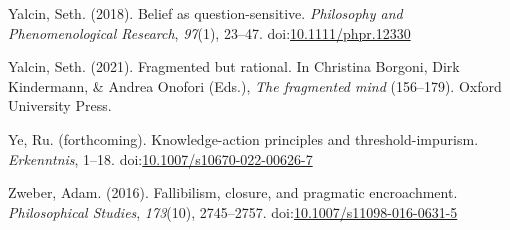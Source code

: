 \documentclass[
  12pt,
  letterpaper,
]{scrbook}
\newlength{\cslhangindent}
\newenvironment{CSLReferences}[2] %
 {\begin{list}{}{%
  \setlength{\itemindent}{0pt}
  \setlength{\leftmargin}{0pt}
  \setlength{\parsep}{0pt}
  \ifodd #1
   \setlength{\leftmargin}{\cslhangindent}
   \setlength{\itemindent}{-1\cslhangindent}
  \fi
  \setlength{\itemsep}{#2\baselineskip}}}
 {\end{list}}
\begin{document}
\begin{CSLReferences}{1}{0}
Yalcin, Seth. (2018). Belief as question-sensitive. \emph{Philosophy and
Phenomenological Research}, \emph{97}(1), 23--47.
doi:\href{https://doi.org/10.1111/phpr.12330}{10.1111/phpr.12330}

Yalcin, Seth. (2021). Fragmented but rational. In Christina Borgoni,
Dirk Kindermann, \& Andrea Onofori (Eds.), \emph{The fragmented mind}
(156--179). Oxford University Press.

Ye, Ru. (forthcoming). Knowledge-action principles and
threshold-impurism. \emph{Erkenntnis}, 1--18.
doi:\href{https://doi.org/10.1007/s10670-022-00626-7}{10.1007/s10670-022-00626-7}

Zweber, Adam. (2016). Fallibilism, closure, and pragmatic encroachment.
\emph{Philosophical Studies}, \emph{173}(10), 2745--2757.
doi:\href{https://doi.org/10.1007/s11098-016-0631-5}{10.1007/s11098-016-0631-5}

\end{CSLReferences}


\backmatter
\end{document}
